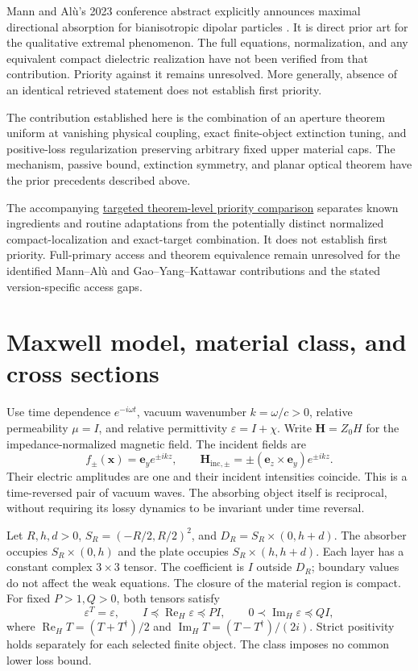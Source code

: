 \documentclass[11pt]{article}
\newcommand{\ReH}{\operatorname{Re}_{\!H}}
\newcommand{\ImH}{\operatorname{Im}_{\!H}}
\newcommand{\ey}{\mathbf e_y}
\newcommand{\ez}{\mathbf e_z}
\begin{document}
Mann and Al\`u's 2023 conference abstract explicitly announces maximal directional absorption for bianisotropic dipolar particles \citep{MannAlu2023}. It is direct prior art for the qualitative extremal phenomenon. The full equations, normalization, and any equivalent compact dielectric realization have not been verified from that contribution. Priority against it remains unresolved. More generally, absence of an identical retrieved statement does not establish first priority.

The contribution established here is the combination of an aperture theorem uniform at vanishing physical coupling, exact finite-object extinction tuning, and positive-loss regularization preserving arbitrary fixed upper material caps. The mechanism, passive bound, extinction symmetry, and planar optical theorem have the prior precedents described above.

The accompanying \href{../priority/TARGETED_PRIORITY_REPORT.md}{targeted theorem-level priority comparison} separates known ingredients and routine adaptations from the potentially distinct normalized compact-localization and exact-target combination. It does not establish first priority. Full-primary access and theorem equivalence remain unresolved for the identified Mann--Al\`u and Gao--Yang--Kattawar contributions and the stated version-specific access gaps.


\section{Maxwell model, material class, and cross sections}\label{sec:model}
Use time dependence $e^{-i\omega t}$, vacuum wavenumber $k=\omega/c>0$, relative permeability $\mu=I$, and relative permittivity $\varepsilon=I+\chi$. Write $\mathbf H=Z_0H$ for the impedance-normalized magnetic field. The incident fields are
\begin{equation}\label{eq:incident}
 f_\pm(\mathbf x)=\ey e^{\pm ikz},\qquad
 \mathbf H_{\mathrm{inc},\pm}=\pm(\ez\times\ey)e^{\pm ikz}.
\end{equation}
Their electric amplitudes are one and their incident intensities coincide. This is a time-reversed pair of vacuum waves. The absorbing object itself is reciprocal, without requiring its lossy dynamics to be invariant under time reversal.

Let $R,h,d>0$, $S_R=(-R/2,R/2)^2$, and $D_R=S_R\times(0,h+d)$. The absorber occupies $S_R\times(0,h)$ and the plate occupies $S_R\times(h,h+d)$. Each layer has a constant complex $3\times3$ tensor. The coefficient is $I$ outside $D_R$; boundary values do not affect the weak equations. The closure of the material region is compact. For fixed $P>1,Q>0$, both tensors satisfy
\begin{equation}\label{eq:material}
 \varepsilon^T=\varepsilon,\qquad
 I\preceq\ReH\varepsilon\preceq PI,\qquad
 0\prec\ImH\varepsilon\preceq QI,
\end{equation}
where $\ReH T=(T+T^\dagger)/2$ and $\ImH T=(T-T^\dagger)/(2i)$. Strict positivity holds separately for each selected finite object. The class imposes no common lower loss bound.
\end{document}
